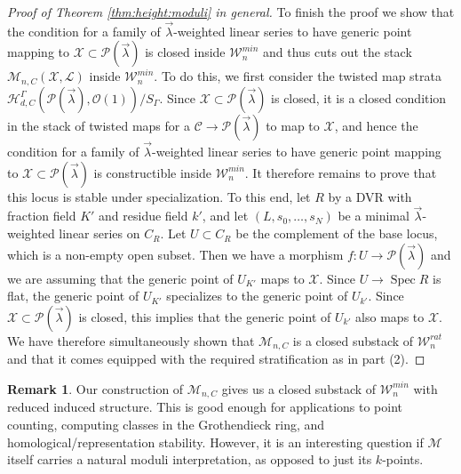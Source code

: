 \documentclass[a4paper,12pt]{amsart}
\theoremstyle{definition}
\newtheorem{rmk}[thm]{Remark}
\newcommand{\cX}{\mathcal{X}}
\newcommand{\cO}{\mathcal{O}}
\newcommand{\cC}{\mathcal{C}}
\newcommand{\cL}{\mathcal{L}}
\newcommand{\cW}{\mathcal{W}}
\newcommand{\cH}{\mathcal{H}}
\newcommand{\cM}{\mathcal{M}}
\newcommand{\Pcv}{\mathcal{P}(\vec{\lambda})}
\newcommand{\lambdavec}{{\vec{\lambda}}}
\DeclareMathOperator{\Spec}{Spec}
\begin{document}
\begin{proof}[Proof of Theorem \ref{thm:height:moduli} in general]
		To finish the proof we show that the condition for a family of $\lambdavec$-weighted linear series to have generic point mapping to $\cX \subset \Pcv$ is closed inside $\cW^{min}_n$ and thus cuts out the stack $\cM_{n,C}(\cX, \cL)$ inside $\cW^{min}_n$. To do this, we first consider the twisted map strata $\cH^\Gamma_{d,C}(\Pcv, \cO(1))/S_\Gamma$. Since $\cX\subset\Pcv$ is closed, it is a closed condition in the stack of twisted maps for a $\cC\to\Pcv$ to map to $\cX$, 
		and hence the condition for a family of $\lambdavec$-weighted linear series to have generic point mapping to $\cX \subset \Pcv$ is constructible inside $\cW^{min}_n$. It therefore remains to prove that this locus is stable under specialization. To this end, let $R$ by a DVR with fraction field $K'$ and residue field $k'$, and let $(L,s_0,\dots,s_N)$ be a minimal $\lambdavec$-weighted linear series on $C_R$. Let $U\subset C_R$ be the complement of the base locus, which is a non-empty open subset. Then we have a morphism $f\colon U\to\Pcv$ and we are assuming that the generic point of $U_{K'}$ maps to $\cX$. Since $U\to\Spec R$ is flat, the generic point of $U_{K'}$ specializes to the generic point of $U_{k'}$. Since $\cX\subset\Pcv$ is closed, this implies that the generic point of $U_{k'}$ also maps to $\cX$. We have therefore simultaneously shown that $\cM_{n,C}$ is a closed substack of $\cW^{rat}_n$ and that it comes equipped with the required stratification as in part (2).
	\end{proof}
	\begin{rmk}
		Our construction of $\cM_{n,C}$ gives us a closed substack of $\cW^{min}_n$ with reduced induced structure. This is good enough for applications to point counting, computing classes in the Grothendieck ring, and homological/representation stability. However, it is an interesting question if $\cM$ itself carries a natural moduli interpretation, as opposed to just its $k$-points.
		
	\end{rmk}
	
\end{document}

